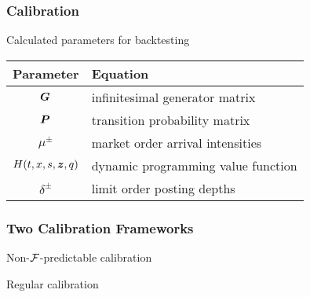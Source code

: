 \begin{frame}
\frametitle{Calibration}
Calculated parameters for backtesting
\begin{table}
\centering%
%
\begin{tabular}{cl}
\toprule
Parameter & Equation \\
\midrule
$\boldsymbol{G}$ & infinitesimal generator matrix \\
$\boldsymbol{P}$ & transition probability matrix \\
$\mu^\pm$ & market order arrival intensities\\
$H(t,x,s,\bm{z},q)$ & dynamic programming value function \\
$\delta^\pm$ & limit order posting depths \\
\bottomrule
\end{tabular}
\end{table}
\end{frame}

\begin{frame}
\frametitle{Two Calibration Frameworks}
Non-$\mathcal{F}$-predictable calibration
\par
Regular calibration
\end{frame}

